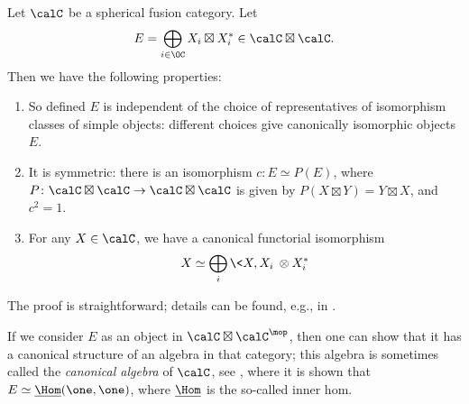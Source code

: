 \begin{lemma}\label{l:spherical-E}
  Let $\calC$ be a spherical fusion category. Let
  \begin{equation}\label{e:spherical-E}
    E = \bigoplus_{i\in \OC} X_i\boxtimes X_i^*\in \calC\boxtimes\calC.
  \end{equation}
  Then we have the following properties:
  \begin{enumerate}
    \item So defined $E$ is independent of the choice of representatives of
    isomorphism classes of simple objects: different choices give canonically
    isomorphic objects $E$.

    \item It is symmetric: there is an isomorphism $c\colon E\simeq P(E)$, where
    $P \colon \calC\boxtimes\calC \to \calC\boxtimes \calC$ is given by
    $P(X\boxtimes Y)= Y\boxtimes X$, and $c^2=1$.

    \item For any $X\in \calC$, we have a canonical functorial isomorphism
    $$
      X \simeq \bigoplus_i\<X, X_i\>\otimes X_i^*
    $$
  \end{enumerate}
\end{lemma}
 The proof  is straightforward; details can be found, e.g.,
  in \cite{balsam-kirillov}.
\begin{remark}
  If we consider $E$ as an object in $\calC\boxtimes\calC^\mop$, then one can
  show that it has a canonical structure of an algebra in that category; this
  algebra is sometimes called the \emph{canonical algebra} of $\calC$, see
  \cite[Example 7.9.14]{etingof-fusion}, where it is shown that $E\simeq
  \underline{\Hom}(\one,\one)$, where $\underline{\Hom}$ is the so-called inner
  hom.
\end{remark}

